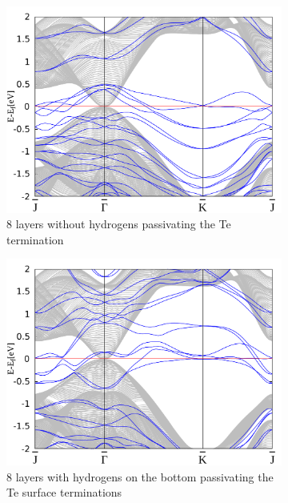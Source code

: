 \begin{figure}[htbp]
		\begin{subfigure}[c]{.48\linewidth}
			\centering
			\includegraphics[width=\linewidth]{Te_and_Hg_termination/no_H_bulk+8_layers_no_dos_-2_2.pdf}
			\caption{8 layers without hydrogens passivating the Te termination}
		\end{subfigure}
		\hfill
		\begin{subfigure}[c]{.48\linewidth}
			\centering
			\includegraphics[width=\linewidth]{Te_and_Hg_termination/bulk+8_layers_no_dos_-2_2.pdf}
			\caption{8 layers with hydrogens on the bottom passivating the Te surface terminations}
		\end{subfigure}
		\begin{subfigure}[c]{.48\linewidth}
			\centering 

\end{subfigure}
\end{figure}
